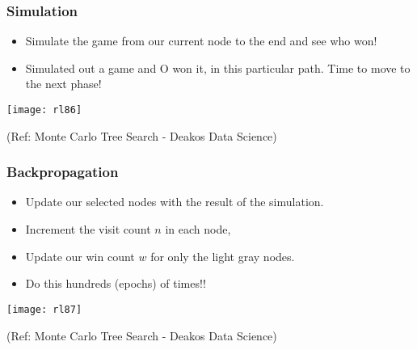\begin{frame}[fragile]\frametitle{Simulation}

\begin{itemize}
\item Simulate the game from our current node to the end and see who won!
\item Simulated out a game and O won it, in this particular path. Time to move to the next phase!
\end{itemize}

\begin{center}
\texttt{[image: rl86]}
\end{center}


{\tiny (Ref: Monte Carlo Tree Search - Deakos Data Science)}

\end{frame}

\begin{frame}[fragile]\frametitle{Backpropagation}

\begin{itemize}
\item Update our selected nodes with the result of the simulation. 
\item Increment the visit count $n$ in each node, 
\item Update our win count $w$ for only the light gray nodes.
\item Do this hundreds (epochs) of times!!
\end{itemize}

\begin{center}
\texttt{[image: rl87]}
\end{center}


{\tiny (Ref: Monte Carlo Tree Search - Deakos Data Science)}

\end{frame}

